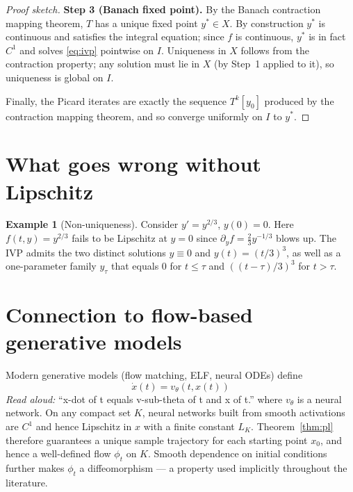 \documentclass[11pt]{article}
\theoremstyle{definition}
\newtheorem{example}[theorem]{Example}
\theoremstyle{remark}
\begin{document}
\begin{proof}[Proof sketch]
  \textbf{Step 3 (Banach fixed point).} By the Banach contraction mapping
  theorem, $T$ has a unique fixed point $y^\ast \in X$. By construction
  $y^\ast$ is continuous and satisfies the integral equation; since $f$
  is continuous, $y^\ast$ is in fact $C^1$ and solves
  \eqref{eq:ivp} pointwise on $I$. Uniqueness in $X$ follows from the
  contraction property; any solution must lie in $X$ (by Step~1 applied
  to it), so uniqueness is global on $I$.

  Finally, the Picard iterates are exactly the sequence $T^k[y_0]$ produced
  by the contraction mapping theorem, and so converge uniformly on $I$
  to $y^\ast$.
\end{proof}

\section{What goes wrong without Lipschitz}

\begin{example}[Non-uniqueness]
  Consider $y' = y^{2/3}$, $y(0) = 0$. Here $f(t, y) = y^{2/3}$ fails to
  be Lipschitz at $y = 0$ since $\partial_y f = \tfrac{2}{3} y^{-1/3}$
  blows up. The IVP admits the two distinct solutions
  $y \equiv 0$ and $y(t) = (t/3)^3$, as well as a one-parameter family
  $y_\tau$ that equals $0$ for $t \le \tau$ and $((t - \tau)/3)^3$ for
  $t > \tau$.
\end{example}

\section{Connection to flow-based generative models}

Modern generative models (flow matching, ELF, neural ODEs) define
\[
  \dot x(t) = v_\theta(t, x(t))
\]
\emph{Read aloud:} ``x-dot of t equals v-sub-theta of t and x of t.''
where $v_\theta$ is a neural network. On any compact set $K$, neural
networks built from smooth activations are $C^1$ and hence Lipschitz in
$x$ with a finite constant $L_K$. Theorem~\ref{thm:pl} therefore
guarantees a unique sample trajectory for each starting point $x_0$, and
hence a well-defined flow $\phi_t$ on $K$. Smooth dependence on initial
conditions further makes $\phi_t$ a diffeomorphism --- a property used
implicitly throughout the literature.
\end{document}
